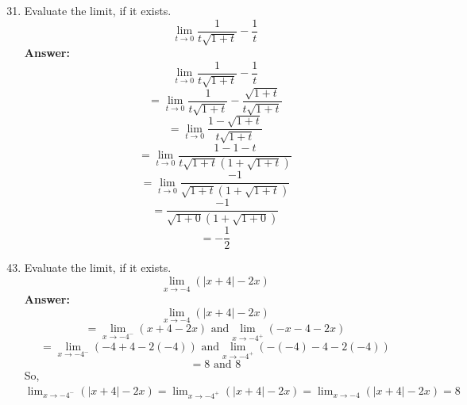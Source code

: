 \documentclass[12pt]{article}
\begin{document}
\newpage
\begin{enumerate}
    \setcounter{enumi}{30}
        \item  Evaluate the limit, if it exists.
        \[ {\displaystyle\lim_{t \to 0} \frac{1}{t \sqrt{1+t}} - \frac{1}{t}} \]
    \textbf{Answer: }
    \[ {\displaystyle\lim_{t \to 0} \frac{1}{t \sqrt{1+t}} - \frac{1}{t}} \]
    \[ = {\displaystyle\lim_{t \to 0} \frac{1}{t \sqrt{1+t}} - \frac{\sqrt{1+t}}{t\sqrt{1+t}}} \]
    \[ = {\displaystyle\lim_{t \to 0} \frac{1 - \sqrt{1 + t}}{t\sqrt{1+t}}} \]
    \[ = {\displaystyle\lim_{t \to 0} \frac{1 - 1 - t}{t\sqrt{1+t}(1 + \sqrt{1 + t})}} \]
    \[ = {\displaystyle\lim_{t \to 0} \frac{-1}{\sqrt{1+t}(1 + \sqrt{1 + t})}} \]
     \[ = {\displaystyle \frac{-1}{\sqrt{1+0}(1 + \sqrt{1 + 0})}} \]
    \[ \boxed{   = - \frac{1}{2}} \]
\end{enumerate}

\begin{enumerate}
    \setcounter{enumi}{42}
        \item  Evaluate the limit, if it exists.
        \[ {\displaystyle\lim_{x \to -4}(|x + 4| - 2x)}\]
    \textbf{Answer: }
    \[ {\displaystyle\lim_{x \to -4}(|x + 4| - 2x)}\]
    \[ = {\displaystyle\lim_{x \to -4^-}(x + 4 - 2x)} \text{ and} {\displaystyle\lim_{x \to -4^+}(-x -4 - 2x)} \]
    \[ = {\displaystyle\lim_{x \to -4^-}(-4 + 4 - 2(-4))} \text{ and} {\displaystyle\lim_{x \to -4^+}(-(-4) -4 - 2(-4))} \]
    \[ = 8 \text{ and } 8 \]
    So, $\boxed{{\displaystyle\lim_{x \to -4^-}(|x + 4| - 2x)} = {\displaystyle\lim_{x \to -4^+}(|x + 4| - 2x)} = \lim_{x \to -4}(|x + 4| - 2x) = 8}$ 
\end{enumerate}
\end{document}
